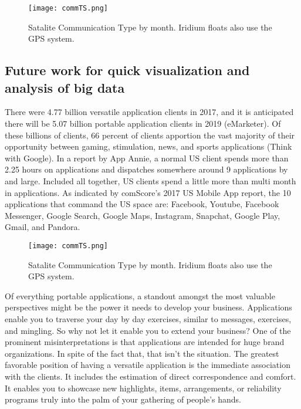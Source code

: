   
  \begin{figure}[ht]
  \centering
  \begin{minipage}{4.5in}
    \texttt{[image: commTS.png]}
    \caption{ \label{fig:commTS} Satalite Communication Type by month. Iridium floats also use the GPS system.}
  \end{minipage}
\end{figure}

\subsection{Future work for quick visualization and analysis of big data}

There were 4.77 billion versatile application clients in 2017, and it is anticipated there will be 5.07 billion portable application clients in 2019 (eMarketer). Of these billions of clients, 66 percent of clients apportion the vast majority of their opportunity between gaming, stimulation, news, and sports applications (Think with Google). In a report by App Annie, a normal US client spends more than 2.25 hours on applications and dispatches somewhere around 9 applications by and large. Included all together, US clients spend a little more than multi month in applications. As indicated by comScore's 2017 US Mobile App report, the 10 applications that command the US space are: Facebook, Youtube, Facebook Messenger, Google Search, Google Maps, Instagram, Snapchat, Google Play, Gmail, and Pandora.


\begin{figure}[ht]
  \centering
  \begin{minipage}{4.5in}
    \texttt{[image: commTS.png]}
    \caption{ \label{fig:commTS} Satalite Communication Type by month. Iridium floats also use the GPS system.}
  \end{minipage}
\end{figure}

Of everything portable applications, a standout amongst the most valuable perspectives might be the power it needs to develop your business. Applications enable you to traverse your day by day exercises, similar to messages, exercises, and mingling. So why not let it enable you to extend your business? One of the prominent misinterpretations is that applications are intended for huge brand organizations. In spite of the fact that, that isn't the situation. The greatest favorable position of having a versatile application is the immediate association with the clients. It includes the estimation of direct correspondence and comfort. It enables you to showcase new highlights, items, arrangements, or reliability programs truly into the palm of your gathering of people's hands. 

